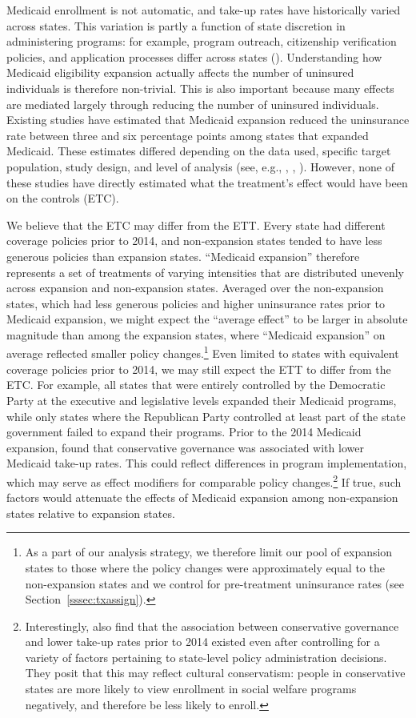 \documentclass[aoas]{imsart}
\theoremstyle{plain}
\theoremstyle{remark}
\begin{document}
Medicaid enrollment is not automatic, and take-up rates have historically varied across states. This variation is partly a function of state discretion in administering programs: for example, program outreach, citizenship verification policies, and application processes differ across states (\cite{courtemanche2017early}). Understanding how Medicaid eligibility expansion actually affects the number of uninsured individuals is therefore non-trivial. This is also important because many effects are mediated largely through reducing the number of uninsured individuals. Existing studies have estimated that Medicaid expansion reduced the uninsurance rate between three and six percentage points among states that expanded Medicaid. These estimates differed depending on the data used, specific target population, study design, and level of analysis (see, e.g., \cite{kaestner2017effects}, \cite{courtemanche2017early}, \cite{frean2017premium}). However, none of these studies have directly estimated what the treatment's effect would have been on the controls (ETC). 

We believe that the ETC may differ from the ETT. Every state had different coverage policies prior to 2014, and non-expansion states tended to have less generous policies than expansion states. ``Medicaid expansion'' therefore represents a set of treatments of varying intensities that are distributed unevenly across expansion and non-expansion states. Averaged over the non-expansion states, which had less generous policies and higher uninsurance rates prior to Medicaid expansion, we might expect the ``average effect'' to be larger in absolute magnitude than among the expansion states, where ``Medicaid expansion'' on average reflected smaller policy changes.\footnote{As a part of our analysis strategy, we therefore limit our pool of expansion states to those where the policy changes were approximately equal to the non-expansion states and we control for pre-treatment uninsurance rates (see Section~\ref{sssec:txassign}).} Even limited to states with equivalent coverage policies prior to 2014, we may still expect the ETT to differ from the ETC. For example, all states that were entirely controlled by the Democratic Party at the executive and legislative levels expanded their Medicaid programs, while only states where the Republican Party controlled at least part of the state government failed to expand their programs. Prior to the 2014 Medicaid expansion, \cite{sommers2012understanding} found that conservative governance was associated with lower Medicaid take-up rates. This could reflect differences in program implementation, which may serve as effect modifiers for comparable policy changes.\footnote{Interestingly, \cite{sommers2012understanding} also find that the association between conservative governance and lower take-up rates prior to 2014 existed even after controlling for a variety of factors pertaining to state-level policy administration decisions. They posit that this may reflect cultural conservatism: people in conservative states are more likely to view enrollment in social welfare programs negatively, and therefore be less likely to enroll.} If true, such factors would attenuate the effects of Medicaid expansion among non-expansion states relative to expansion states.
\end{document}
